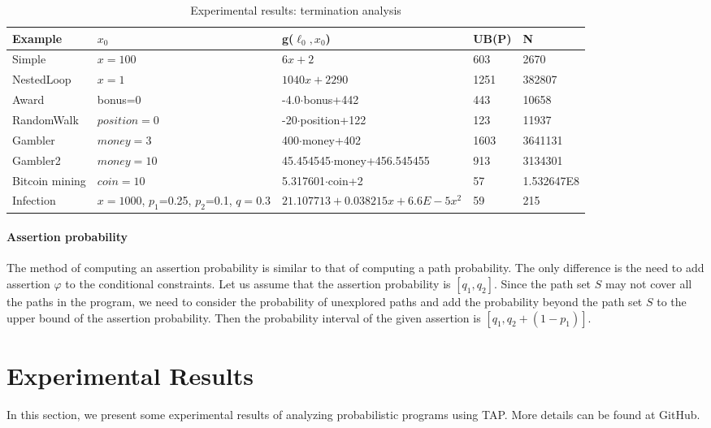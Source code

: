 \documentclass[sigconf,review, anonymous]{acmart}
\begin{document}
\begin{table*}[htb]
	\caption{Experimental results: termination analysis}  
	\label{TerminationResult} 
	\begin{center}  
		\begin{tabular}{|l|l|l|l|l|}  
			\hline  	
			Example & $x_0$ & g($\ell_0,x_0$) & UB(P) & N\\ \hline  	
			Simple & $x=100$  & $6x+2$ & 603 & 2670 \\ \hline  		
			NestedLoop & $x=1$ & $1040x+2290$ & 1251 & 382807 \\  \hline  
			Award & bonus=0 & -4.0$\cdot$bonus+442& 443 &10658 \\  \hline  
			RandomWalk & $position=0$ & -20$\cdot$position+122 & 123 & 11937 \\  \hline  
			Gambler& $money=3$ & 400$\cdot$money+402& 1603 & 3641131 \\ \hline  		 
			Gambler2 & $money=10$ & 45.454545$\cdot$money+456.545455 & 913 & 3134301 \\  \hline  
			Bitcoin mining & $coin=10$ & 5.317601$\cdot$coin+2 & 57 & 1.532647E8 \\  \hline 
			Infection & $x=1000$, $p_1$=0.25, $p_2$=0.1, $q=0.3$ & $21.107713+0.038215x+6.6E-5x^2$& 59 & 215 \\  \hline  
		\end{tabular}  
	\end{center}  
\end{table*}

\paragraph{Assertion probability} The method of computing an assertion probability is similar to that of computing a path probability. The only difference is the need to add assertion $\varphi$ to the conditional constraints. Let us assume that the assertion probability is $[q_1,q_2]$. Since the path set $S$ may not cover all the paths in the program, we need to consider the probability of unexplored paths and add the probability beyond the path set $S$ to the upper bound of the assertion probability. Then the probability interval of the given assertion is $[q_1,q_2+(1-p_1)]$.

\section{Experimental Results}
In this section, we present some experimental results of analyzing probabilistic programs using TAP. More details can be found at GitHub.
\end{document}
